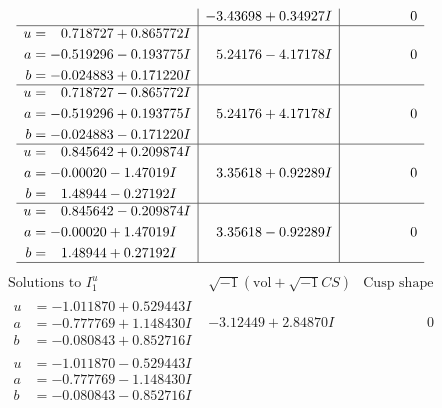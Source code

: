 \documentclass[1p]{elsarticle_modified}
\theoremstyle{definition}
\newcommand{\I}{\sqrt{-1}}
\begin{document}
$$\begin{array}{c|c|c}
 & -3.43698 + 0.34927 I & \phantom{-0.000000 } 0 \\ \hline\begin{aligned}
u &= \phantom{-}0.718727 + 0.865772 I \\
a &= -0.519296 - 0.193775 I \\
b &= -0.024883 + 0.171220 I\end{aligned}
 & \phantom{-}5.24176 - 4.17178 I & \phantom{-0.000000 } 0 \\ \hline\begin{aligned}
u &= \phantom{-}0.718727 - 0.865772 I \\
a &= -0.519296 + 0.193775 I \\
b &= -0.024883 - 0.171220 I\end{aligned}
 & \phantom{-}5.24176 + 4.17178 I & \phantom{-0.000000 } 0 \\ \hline\begin{aligned}
u &= \phantom{-}0.845642 + 0.209874 I \\
a &= -0.00020 - 1.47019 I \\
b &= \phantom{-}1.48944 - 0.27192 I\end{aligned}
 & \phantom{-}3.35618 + 0.92289 I & \phantom{-0.000000 } 0 \\ \hline\begin{aligned}
u &= \phantom{-}0.845642 - 0.209874 I \\
a &= -0.00020 + 1.47019 I \\
b &= \phantom{-}1.48944 + 0.27192 I\end{aligned}
 & \phantom{-}3.35618 - 0.92289 I & \phantom{-0.000000 } 0\\
 \hline 
 \end{array}$$\newpage$$\begin{array}{c|c|c}  
\text{Solutions to }I^u_{1}& \I (\text{vol} + \sqrt{-1}CS) & \text{Cusp shape}\\
 \hline 
\begin{aligned}
u &= -1.011870 + 0.529443 I \\
a &= -0.777769 + 1.148430 I \\
b &= -0.080843 + 0.852716 I\end{aligned}
 & -3.12449 + 2.84870 I & \phantom{-0.000000 } 0 \\ \hline\begin{aligned}
u &= -1.011870 - 0.529443 I \\
a &= -0.777769 - 1.148430 I \\
b &= -0.080843 - 0.852716 I\end{aligned}

\end{array}$$
\end{document}
